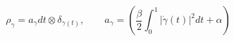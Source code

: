 \documentclass[varwidth=true, border=0pt, convert={size=640x}]{standalone}
\newcommand{\abs}[1]{\left\lvert#1\right\rvert}
\begin{document}
\begin{equation*}
        \rho_{\gamma} = a_{\gamma} dt \otimes \delta_{\gamma(t)}, \qquad 
        a_{\gamma} = \left( \frac{\beta}{2} \int_{0}^{1} \abs{\dot \gamma(t)}^2 dt 
        + \alpha \right)
\end{equation*}
\end{document}
